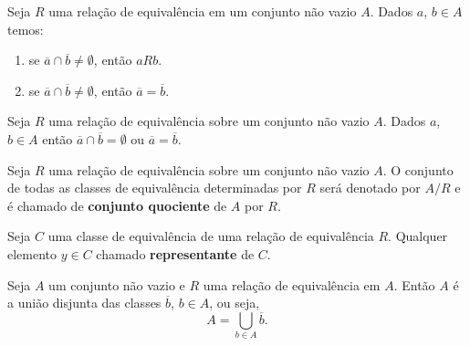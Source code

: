 \documentclass{beamer}
\begin{document}
    \begin{frame}
        \begin{proposicao}
            Seja $R$ uma rela{\c c}{\~a}o de equival{\^e}ncia \pause em um conjunto n{\~a}o vazio $A$. \pause Dados $a$, $b \in A$ temos:\pause
            \begin{enumerate}[label={\roman*})]
                \item se $\overline{a} \cap \overline{b} \ne \emptyset$, \pause ent{\~a}o $aRb$.\pause \vspace{.3cm}
                \item se  $\overline{a} \cap \overline{b} \neq \emptyset$, \pause ent{\~a}o $\overline{a} = \overline{b}$.
            \end{enumerate}
        \end{proposicao}

        \begin{corolario}
            Seja $R$ uma rela\c{c}\~ao de equival\^encia sobre um conjunto n\~ao vazio $A$. \pause Dados $a$, $b \in A$ \pause ent\~ao $\overline{a} \cap \overline{b} = \emptyset$ \pause ou $\overline{a} = \overline{b}$.\pause
        \end{corolario}

    \end{frame}

    \begin{frame}
        \begin{definicao}
            Seja $R$ uma rela\c{c}\~ao de equival\^encia sobre um conjunto n\~ao vazio $A$. \pause O conjunto de todas as classes de equival{\^e}ncia \pause determinadas por $R$ ser{\'a} \pause denotado por $A/R$ \pause e {\'e} chamado de \textbf{conjunto quociente} de $A$ por $R$.\pause
        \end{definicao}
    \end{frame}

    \begin{frame}
        \begin{definicao}
            Seja $C$ uma classe de equival{\^e}ncia \pause de uma rela{\c c}{\~a}o de equival{\^e}ncia $R$. \pause Qualquer elemento $y\in C$  chamado \textbf{representante} de $C$.\pause
        \end{definicao}

        \begin{proposicao}
            Seja $A$ um conjunto n{\~a}o vazio \pause e $R$ uma rela{\c c}{\~a}o de equival{\^e}ncia em $A$. \pause Ent{\~a}o $A$ {\'e} a uni{\~a}o disjunta das classes $\overline{b}$, $b \in A$, ou seja,\pause
            \[
                A = \bigcup_{b\in A}\overline{b}.
            \]
        \end{proposicao}
    \end{frame}
\end{document}
